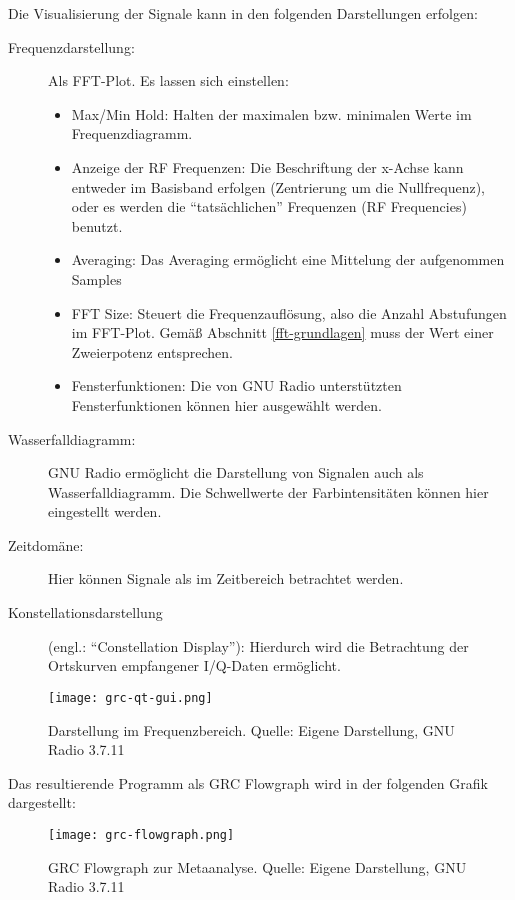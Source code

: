 Die Visualisierung der Signale kann in den folgenden Darstellungen erfolgen:
\begin{description}
	\item[Frequenzdarstellung:] Als FFT-Plot. Es lassen sich einstellen:
		\begin{itemize}
			\item Max/Min Hold: Halten der maximalen bzw. minimalen Werte im Frequenzdiagramm.
			\item Anzeige der RF Frequenzen: Die Beschriftung der x-Achse kann entweder im Basisband erfolgen (Zentrierung um die Nullfrequenz), oder es werden die \enquote{tatsächlichen} Frequenzen (RF Frequencies) benutzt.
			\item  Averaging: Das Averaging ermöglicht eine Mittelung der aufgenommen Samples
			\item FFT Size: Steuert die Frequenzauflösung, also die Anzahl Abstufungen im FFT-Plot. Gemäß Abschnitt \ref{fft-grundlagen} muss der Wert einer Zweierpotenz entsprechen.
			\item Fensterfunktionen: Die von GNU Radio unterstützten Fensterfunktionen können hier ausgewählt werden.
		\end{itemize}
	\item[Wasserfalldiagramm:] GNU Radio ermöglicht die Darstellung von Signalen auch als Wasserfalldiagramm. Die Schwellwerte der Farbintensitäten können hier eingestellt werden. 
	\item[Zeitdomäne:] Hier können Signale als im Zeitbereich betrachtet werden.
	\item[Konstellationsdarstellung] (engl.: \enquote{Constellation Display}): Hierdurch wird die Betrachtung der Ortskurven empfangener I/Q-Daten ermöglicht.
\end{description}

\begin{figure}[ht]
	\centering
	\texttt{[image: grc-qt-gui.png]}
	\caption[Darstellung im Frequenzbereich]{Darstellung im Frequenzbereich. Quelle: Eigene Darstellung, GNU Radio 3.7.11} 
	\label{grc-qt-gui}
\end{figure}



Das resultierende Programm als GRC Flowgraph wird in der folgenden Grafik dargestellt:
\begin{figure}[H]
	\centering
	\texttt{[image: grc-flowgraph.png]}
	\caption[GRC Flowgraph zur Metaanalyse]{GRC Flowgraph zur Metaanalyse. Quelle: Eigene Darstellung, GNU Radio 3.7.11} 
	\label{grc-flowgraph}
\end{figure}

